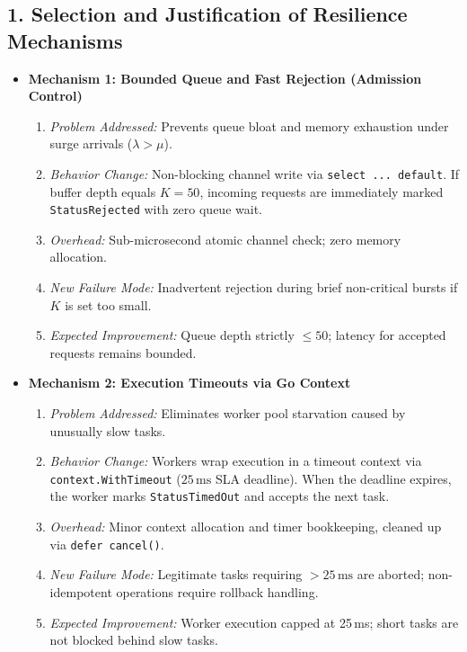 \documentclass[11pt]{article}
\begin{document}
\subsection*{1. Selection and Justification of Resilience Mechanisms}
\begin{itemize}[itemsep=0.1em]
    \item \textbf{Mechanism 1: Bounded Queue and Fast Rejection (Admission Control)}
    \begin{enumerate}[label=(\alph*), itemsep=0.15em]
        \item \textit{Problem Addressed:} Prevents queue bloat and memory exhaustion under surge arrivals ($\lambda > \mu$).
        \item \textit{Behavior Change:} Non-blocking channel write via \texttt{select ... default}. If buffer depth equals $K=50$, incoming requests are immediately marked \texttt{StatusRejected} with zero queue wait.
        \item \textit{Overhead:} Sub-microsecond atomic channel check; zero memory allocation.
        \item \textit{New Failure Mode:} Inadvertent rejection during brief non-critical bursts if $K$ is set too small.
        \item \textit{Expected Improvement:} Queue depth strictly $\le 50$; latency for accepted requests remains bounded.
    \end{enumerate}

    \item \textbf{Mechanism 2: Execution Timeouts via Go Context}
    \begin{enumerate}[label=(\alph*), itemsep=0.15em]
        \item \textit{Problem Addressed:} Eliminates worker pool starvation caused by unusually slow tasks.
        \item \textit{Behavior Change:} Workers wrap execution in a timeout context via \texttt{context.WithTimeout} ($25\,\text{ms}$ SLA deadline). When the deadline expires, the worker marks \texttt{StatusTimedOut} and accepts the next task.
        \item \textit{Overhead:} Minor context allocation and timer bookkeeping, cleaned up via \texttt{defer cancel()}.
        \item \textit{New Failure Mode:} Legitimate tasks requiring $> 25\,\text{ms}$ are aborted; non-idempotent operations require rollback handling.
        \item \textit{Expected Improvement:} Worker execution capped at 25\,ms; short tasks are not blocked behind slow tasks.
    \end{enumerate}
\end{itemize}
\end{document}
